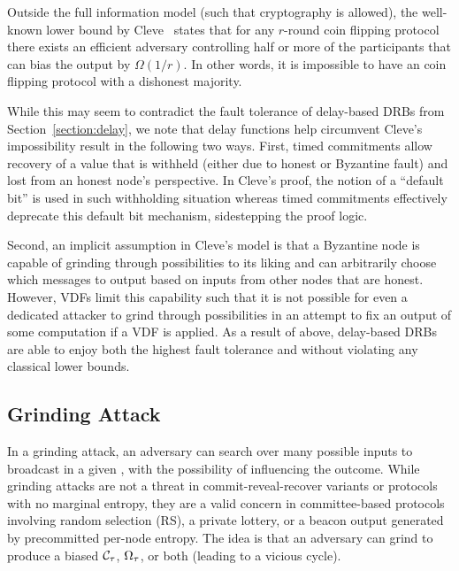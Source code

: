Outside the full information model (such that cryptography is allowed), the well-known lower bound by Cleve~\cite{cleve1986limits} states that for any $r$-round coin flipping protocol there exists an efficient adversary controlling half or more of the participants that can bias the output by $\Omega(1 / r)$.
In other words, it is impossible to have an \drbsecure coin flipping protocol with a dishonest majority.

While this may seem to contradict the fault tolerance of delay-based DRBs from Section~\ref{section:delay}, we note that delay functions help circumvent Cleve's impossibility result in the following two ways.
First, timed commitments allow recovery of a value that is withheld (either due to honest or Byzantine fault) and lost from an honest node's perspective.
In Cleve's proof, the notion of a ``default bit'' is used in such withholding situation whereas timed commitments effectively deprecate this default bit mechanism, sidestepping the proof logic.

Second, an implicit assumption in Cleve's model is that a Byzantine node is capable of grinding through possibilities to its liking and can arbitrarily choose which messages to output based on inputs from other nodes that are honest.
However, VDFs limit this capability such that it is not possible for even a dedicated attacker to grind through possibilities in an attempt to fix an output of some computation if a VDF is applied.
As a result of above, delay-based DRBs are able to enjoy both the highest fault tolerance and \drbsecurity without violating any classical lower bounds.

\iffalse
\subsection{Grinding Attack}
In a grinding attack, an adversary can search over many possible inputs to broadcast in a given \epoch, with the possibility of influencing the outcome. While grinding attacks are not a threat in commit-reveal-recover variants or protocols with no marginal entropy, they are a valid concern in committee-based protocols involving random selection (RS), a private lottery, or a beacon output generated by precommitted per-node entropy. The idea is that an adversary can grind to produce a biased $\mathcal{C}_\tau$, $\Omega_\tau$, or both (leading to a vicious cycle).

